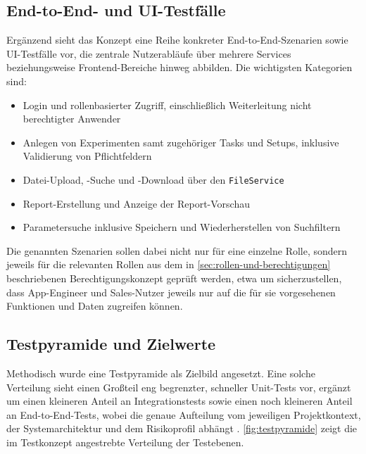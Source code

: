 \subsection{End-to-End- und UI-Testfälle}
\label{sec:e2e-ui-testfaelle}
Ergänzend sieht das Konzept eine Reihe konkreter End-to-End-Szenarien sowie UI-Testfälle vor, die zentrale Nutzerabläufe über mehrere Services beziehungsweise Frontend-Bereiche hinweg abbilden. Die wichtigsten Kategorien sind:
\begin{itemize}
    \item Login und rollenbasierter Zugriff, einschließlich Weiterleitung nicht berechtigter Anwender
    \item Anlegen von Experimenten samt zugehöriger Tasks und Setups, inklusive Validierung von Pflichtfeldern
    \item Datei-Upload, -Suche und -Download über den \texttt{FileService}
    \item Report-Erstellung und Anzeige der Report-Vorschau
    \item Parametersuche inklusive Speichern und Wiederherstellen von Suchfiltern
\end{itemize}

Die genannten Szenarien sollen dabei nicht nur für eine einzelne Rolle, sondern jeweils für die relevanten Rollen aus dem in \autoref{sec:rollen-und-berechtigungen} beschriebenen Berechtigungskonzept geprüft werden, etwa um sicherzustellen, dass App-Engineer und Sales-Nutzer jeweils nur auf die für sie vorgesehenen Funktionen und Daten zugreifen können.

\subsection{Testpyramide und Zielwerte}
Methodisch wurde eine Testpyramide als Zielbild angesetzt. Eine solche Verteilung sieht einen Großteil eng begrenzter, schneller Unit-Tests vor, ergänzt um einen kleineren Anteil an Integrationstests sowie einen noch kleineren Anteil an End-to-End-Tests, wobei die genaue Aufteilung vom jeweiligen Projektkontext, der Systemarchitektur und dem Risikoprofil abhängt \autocite{QFTest2024}. \autoref{fig:testpyramide} zeigt die im Testkonzept angestrebte Verteilung der Testebenen.

